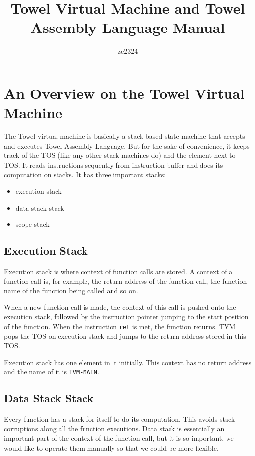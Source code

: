 \documentclass{article}
\title{Towel Virtual Machine and Towel Assembly Language Manual}
\author{zc2324}
\begin{document}
\maketitle
\tableofcontents

\section{An Overview on the Towel Virtual Machine}

The Towel virtual machine is basically a stack-based state machine that accepts and executes Towel Assembly Language. But for the sake of convenience, it keeps track of the TOS (like any other stack machines do) and the element next to TOS. It reads instructions sequently from instruction buffer and does its computation on stacks. It has three important stacks:
\begin{itemize}
\item execution stack
\item data stack stack
\item scope stack
\end{itemize}

\subsection{Execution Stack}

Execution stack is where context of function calls are stored. A context of a function call is, for example, the return address of the function call, the function name of the function being called and so on.

When a new function call is made, the context of this call is pushed onto the execution stack, followed by the instruction pointer jumping to the start position of the function. When the instruction \texttt{ret} is met, the function returns. TVM pops the TOS on execution stack and jumps to the return address stored in this TOS.

Execution stack has one element in it initially. This context has no return address and the name of it is \texttt{TVM-MAIN}.

\subsection{Data Stack Stack}

Every function has a stack for itself to do its computation. This avoids stack corruptions along all the function executions. Data stack is essentially an important part of the context of the function call, but it is so important, we would like to operate them manually so that we could be more flexible.
\end{document}
